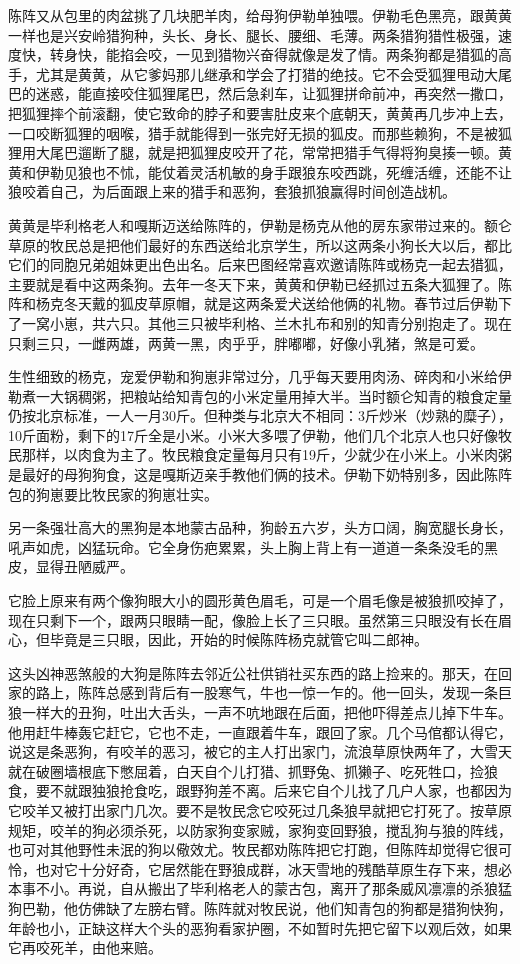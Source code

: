 \par 陈阵又从包里的肉盆挑了几块肥羊肉，给母狗伊勒单独喂。伊勒毛色黑亮，跟黄黄一样也是兴安岭猎狗种，头长、身长、腿长、腰细、毛薄。两条猎狗猎性极强，速度快，转身快，能掐会咬，一见到猎物兴奋得就像是发了情。两条狗都是猎狐的高手，尤其是黄黄，从它爹妈那儿继承和学会了打猎的绝技。它不会受狐狸甩动大尾巴的迷惑，能直接咬住狐狸尾巴，然后急刹车，让狐狸拼命前冲，再突然一撒口，把狐狸摔个前滚翻，使它致命的脖子和要害肚皮来个底朝天，黄黄再几步冲上去，一口咬断狐狸的咽喉，猎手就能得到一张完好无损的狐皮。而那些赖狗，不是被狐狸用大尾巴遛断了腿，就是把狐狸皮咬开了花，常常把猎手气得将狗臭揍一顿。黄黄和伊勒见狼也不怵，能仗着灵活机敏的身手跟狼东咬西跳，死缠活缠，还能不让狼咬着自己，为后面跟上来的猎手和恶狗，套狼抓狼赢得时间创造战机。
\par 黄黄是毕利格老人和嘎斯迈送给陈阵的，伊勒是杨克从他的房东家带过来的。额仑草原的牧民总是把他们最好的东西送给北京学生，所以这两条小狗长大以后，都比它们的同胞兄弟姐妹更出色出名。后来巴图经常喜欢邀请陈阵或杨克一起去猎狐，主要就是看中这两条狗。去年一冬天下来，黄黄和伊勒已经抓过五条大狐狸了。陈阵和杨克冬天戴的狐皮草原帽，就是这两条爱犬送给他俩的礼物。春节过后伊勒下了一窝小崽，共六只。其他三只被毕利格、兰木扎布和别的知青分别抱走了。现在只剩三只，一雌两雄，两黄一黑，肉乎乎，胖嘟嘟，好像小乳猪，煞是可爱。
\par 生性细致的杨克，宠爱伊勒和狗崽非常过分，几乎每天要用肉汤、碎肉和小米给伊勒煮一大锅稠粥，把粮站给知青包的小米定量用掉大半。当时额仑知青的粮食定量仍按北京标准，一人一月30斤。但种类与北京大不相同：3斤炒米（炒熟的糜子），10斤面粉，剩下的17斤全是小米。小米大多喂了伊勒，他们几个北京人也只好像牧民那样，以肉食为主了。牧民粮食定量每月只有19斤，少就少在小米上。小米肉粥是最好的母狗狗食，这是嘎斯迈亲手教他们俩的技术。伊勒下奶特别多，因此陈阵包的狗崽要比牧民家的狗崽壮实。
\par 另一条强壮高大的黑狗是本地蒙古品种，狗龄五六岁，头方口阔，胸宽腿长身长，吼声如虎，凶猛玩命。它全身伤疤累累，头上胸上背上有一道道一条条没毛的黑皮，显得丑陋威严。
\par 它脸上原来有两个像狗眼大小的圆形黄色眉毛，可是一个眉毛像是被狼抓咬掉了，现在只剩下一个，跟两只眼睛一配，像脸上长了三只眼。虽然第三只眼没有长在眉心，但毕竟是三只眼，因此，开始的时候陈阵杨克就管它叫二郎神。
\par 这头凶神恶煞般的大狗是陈阵去邻近公社供销社买东西的路上捡来的。那天，在回家的路上，陈阵总感到背后有一股寒气，牛也一惊一乍的。他一回头，发现一条巨狼一样大的丑狗，吐出大舌头，一声不吭地跟在后面，把他吓得差点儿掉下牛车。他用赶牛棒轰它赶它，它也不走，一直跟着牛车，跟回了家。几个马倌都认得它，说这是条恶狗，有咬羊的恶习，被它的主人打出家门，流浪草原快两年了，大雪天就在破圈墙根底下憋屈着，白天自个儿打猎、抓野兔、抓獭子、吃死牲口，捡狼食，要不就跟独狼抢食吃，跟野狗差不离。后来它自个儿找了几户人家，也都因为它咬羊又被打出家门几次。要不是牧民念它咬死过几条狼早就把它打死了。按草原规矩，咬羊的狗必须杀死，以防家狗变家贼，家狗变回野狼，搅乱狗与狼的阵线，也可对其他野性未泯的狗以儆效尤。牧民都劝陈阵把它打跑，但陈阵却觉得它很可怜，也对它十分好奇，它居然能在野狼成群，冰天雪地的残酷草原生存下来，想必本事不小。再说，自从搬出了毕利格老人的蒙古包，离开了那条威风凛凛的杀狼猛狗巴勒，他仿佛缺了左膀右臂。陈阵就对牧民说，他们知青包的狗都是猎狗快狗，年龄也小，正缺这样大个头的恶狗看家护圈，不如暂时先把它留下以观后效，如果它再咬死羊，由他来赔。
